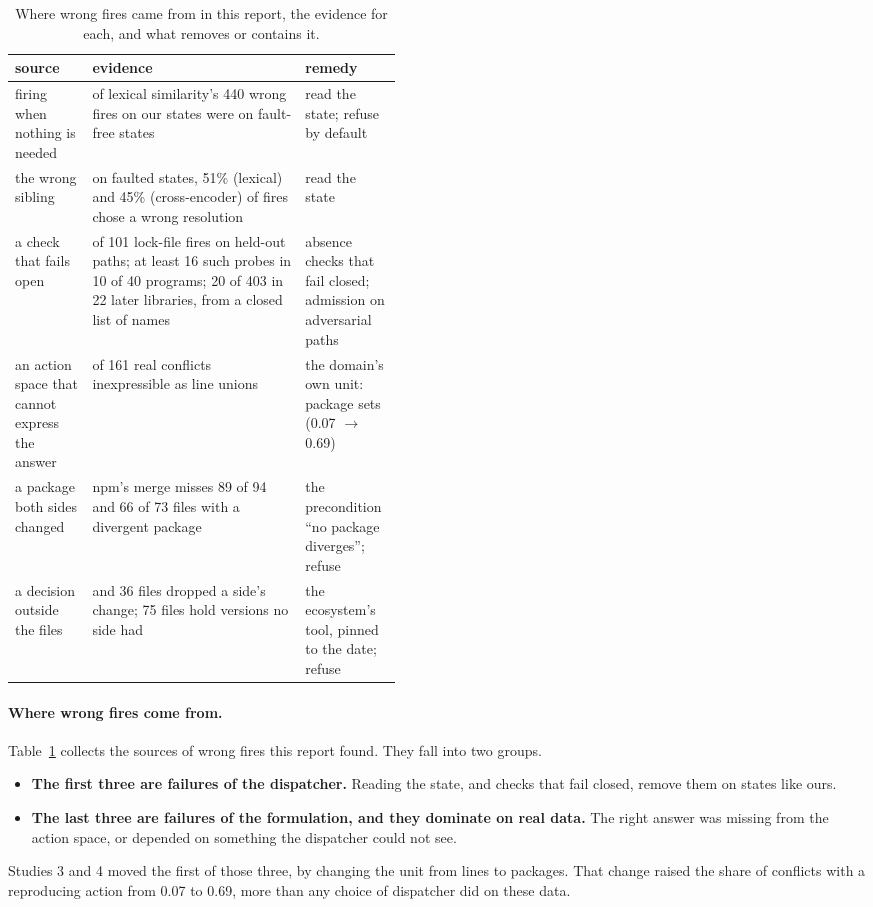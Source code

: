 \documentclass[11pt]{article}
\begin{document}
\begin{table}[t]
\centering
\caption{Where wrong fires came from in this report, the evidence for each, and what removes or
contains it.}
\label{tab:taxonomy}
\small
\renewcommand{\arraystretch}{1.25}
\begin{tabularx}{\linewidth}{>{\raggedright\arraybackslash}p{0.2\linewidth}
>{\raggedright\arraybackslash}X >{\raggedright\arraybackslash}p{0.25\linewidth}}
\toprule
source & evidence & remedy \\
\midrule
firing when nothing is needed & 318 of lexical similarity's 440 wrong fires on our states were on
fault-free states & read the state; refuse by default \\
the wrong sibling & on faulted states, 51\% (lexical) and 45\% (cross-encoder) of fires chose a
wrong resolution & read the state \\
a check that fails open & 41 of 101 lock-file fires on held-out paths; at least 16 such probes
in 10 of 40 programs; 20 of 403 in 22 later libraries, from a closed list of names & absence checks that fail closed; admission on adversarial paths \\
an action space that cannot express the answer & 160 of 161 real conflicts inexpressible as
line unions & the domain's own unit: package sets (0.07 $\to$ 0.69) \\
a package both sides changed & npm's merge misses 89 of 94 and 66 of 73 files with a divergent package &
the precondition ``no package diverges''; refuse \\
a decision outside the files & 52 and 36 files dropped a side's change; 75 files hold versions
no side had & the ecosystem's tool, pinned to the date; refuse \\
\bottomrule
\end{tabularx}
\end{table}

\paragraph{Where wrong fires come from.}
Table~\ref{tab:taxonomy} collects the sources of wrong fires this report found. They fall into
two groups.
\begin{itemize}
  \item \textbf{The first three are failures of the dispatcher.} Reading the state, and checks
  that fail closed, remove them on states like ours.
  \item \textbf{The last three are failures of the formulation, and they dominate on real data.}
  The right answer was missing from the action space, or depended on something the dispatcher
  could not see.
\end{itemize}
Studies 3 and 4 moved the first of those three, by changing the unit from lines to packages.
That change raised the share of conflicts with a reproducing action from 0.07 to 0.69, more
than any choice of dispatcher did on these data.
\end{document}

